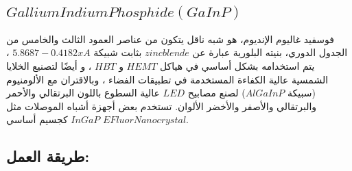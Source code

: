 \subsection{$Gallium Indium Phosphide (GaInP) $}
فوسفيد غاليوم الإنديوم، هو شبه ناقل يتكون من عناصر العمود الثالث والخامس من الجدول الدوري، بنيته البلورية عبارة عن $ zinc blende $ بثابت شبيكة $	5.8687-0.4182x A $ ، يتم استخدامه بشكل أساسي في هياكل $ HEMT $ و $ HBT $ ، و أيضًا لتصنيع الخلايا الشمسية عالية الكفاءة المستخدمة في تطبيقات الفضاء ، وبالاقتران مع الألومنيوم (سبيكة $ AlGaInP $) لصنع مصابيح $ LED $ عالية السطوع باللون البرتقالي والأحمر والبرتقالي والأصفر والأخضر الألوان. تستخدم بعض أجهزة أشباه الموصلات مثل $ EFluor Nanocrystal $ $ InGaP $ كجسيم أساسي. 


\subsection{طريقة العمل:}

